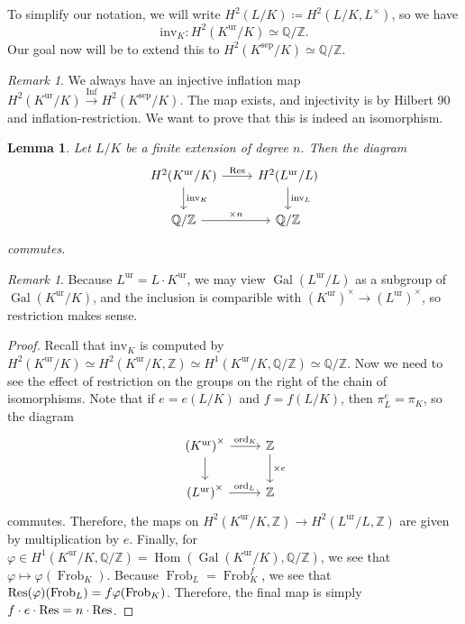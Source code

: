 \documentclass[leqno, openany]{memoir}
\newtheorem{lem}[thm]{Lemma}
\theoremstyle{definition}
\theoremstyle{remark}
\newtheorem{rmk}[thm]{Remark}
\theoremstyle{plain}
\theoremstyle{definition}
\theoremstyle{remark}
\newcommand{\Z}{\mathbb{Z}}
\newcommand{\Q}{\mathbb{Q}}
\newcommand{\mr}[1]{\mathrm{#1}}
\DeclareMathOperator{\Hom}{Hom}
\DeclareMathOperator{\Gal}{Gal}
\DeclareMathOperator{\Inf}{Inf}
\DeclareMathOperator{\Frob}{Frob}
\begin{document}
To simplify our notation, we will write $H^2(L/K) \coloneqq H^2(L/K, L^{\times})$, so we have 
\[ \mr{inv}_K \colon H^2(K^{\mr{ur}}/K) \simeq \Q/\Z. \] 
Our goal now will be to extend this to $H^2(K^{\mr{sep}}/K) \simeq \Q/\Z$.

\begin{rmk}
    We always have an injective inflation map $H^2(K^{\mr{ur}}/K) \xrightarrow{\Inf} H^2(K^{\mr{sep}}/K)$. The map exists, and injectivity is by Hilbert 90 and inflation-restriction. We want to prove that this is indeed an isomorphism.
\end{rmk}

\begin{lem}
    Let $L/K$ be a finite extension of degree $n$. Then the diagram
    \begin{equation*}
    \begin{tikzcd}
        H^2(K^{\mr{ur}}/K) \ar{d}{\mr{inv}_K} \ar{r}{\Res} & H^2(L^{\mr{ur}}/L) \ar{d}{\mr{inv}_L} \\
        \Q/\Z \ar{r}{\times n} & \Q/\Z
    \end{tikzcd}
    \end{equation*}
    commutes.
\end{lem}

\begin{rmk}
    Because $L^{\mr{ur}} = L \cdot K^{\mr{ur}}$, we may view $\Gal(L^{\mr{ur}}/L)$ as a subgroup of $\Gal(K^{\mr{ur}}/K)$, and the inclusion is comparible with ${(K^{\mr{ur}})}^{\times} \to {(L^{\mr{ur}})}^{\times}$, so restriction makes sense.
\end{rmk}

\begin{proof}
    Recall that $\mr{inv}_K$ is computed by $H^2(K^{\mr{ur}}/K) \simeq H^2(K^{\mr{ur}}/K, \Z) \simeq H^1(K^{\mr{ur}}/K, \Q/\Z) \simeq \Q/\Z$. Now we need to see the effect of restriction on the groups on the right of the chain of isomorphisms. Note that if $e = e(L/K)$ and $f = f(L/K)$, then $\pi_L^e = \pi_K$, so the diagram
    \begin{equation*}
    \begin{tikzcd}
        {(K^{\mr{ur}})}^{\times} \ar{d} \ar{r}{\mr{ord}_K} & \Z \ar{d}{\times e} \\
        {(L^{\mr{ur}})}^{\times} \ar{r}{\mr{ord}_L} & \Z
    \end{tikzcd}
    \end{equation*}
    commutes. Therefore, the maps on $H^2(K^{\mr{ur}}/K, \Z) \to H^2(L^{\mr{ur}}/L, \Z)$ are given by multiplication by $e$. Finally, for $\varphi \in H^1(K^{\mr{ur}}/K, \Q/\Z) = \Hom(\Gal(K^{\mr{ur}}/K), \Q/\Z)$, we see that $\varphi \mapsto \varphi(\Frob_K)$. Because $\Frob_L = \Frob_K^f$, we see that $\Res(\varphi)(\Frob_L) = f \varphi(\Frob_K)$. Therefore, the final map is simply $f \cdot e \cdot \Res = n \cdot \Res$.
\end{proof}
\end{document}
